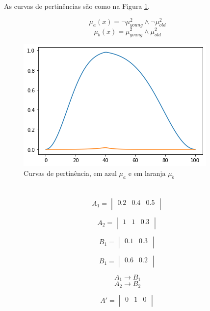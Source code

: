 \documentclass[conference]{IEEEtran}
\newcommand\w{1.0}
\begin{document}
\par As curvas de pertinências são como na Figura \ref{fig:plot04}.

\[\mu_{a}(x) = \neg \mu_{young}^2 \wedge \neg \mu_{old}^2\]
\[\mu_{b}(x) = \mu_{young}^2 \wedge \mu_{old}^2\]

\begin{figure}[htbp]
\centering
\includegraphics[width=\w\linewidth]{fig/plot04.png}
\caption{Curvas de pertinência, em azul $\mu_{a}$ e em laranja $\mu_{b}$}
\label{fig:plot04}
\end{figure}

\hfill
\section{}  %

\[
A_1 = 
\begin{vmatrix}
0.2 & 0.4 & 0.5 \\
\end{vmatrix}
\]

\[
A_2 = 
\begin{vmatrix}
1 & 1 & 0.3 \\
\end{vmatrix}
\]

\[
B_1 = 
\begin{vmatrix}
0.1 & 0.3 \\
\end{vmatrix}
\]

\[
B_1 = 
\begin{vmatrix}
0.6 & 0.2 \\
\end{vmatrix}
\]

\[A_1 \rightarrow B_1\]
\[A_2 \rightarrow B_2\]

\[
A' = 
\begin{vmatrix}
0 & 1 & 0 \\
\end{vmatrix}
\]
\end{document}
